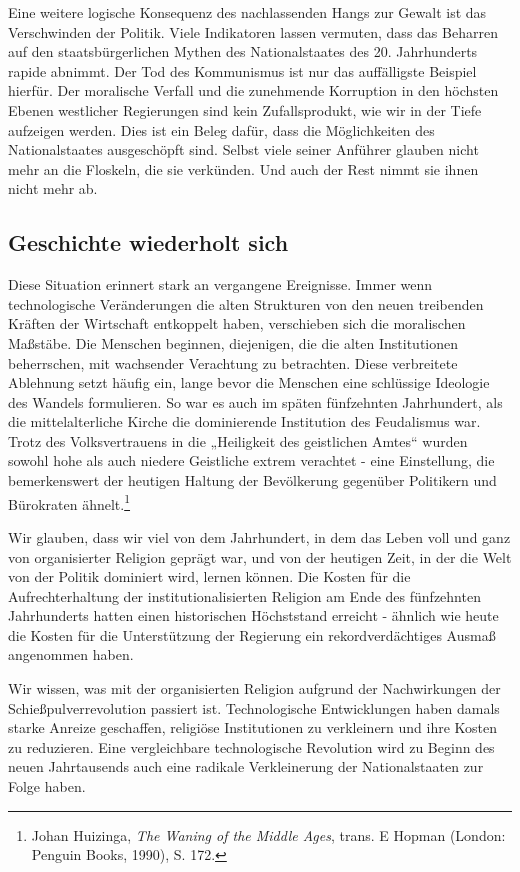 \documentclass[
  a5paper,
  smalldemyvopaper,10pt,twoside,onecolumn,openright,extrafontsizes,hidelinks]{memoir}
\begin{document}
Eine weitere logische Konsequenz des nachlassenden Hangs zur Gewalt ist
das Verschwinden der Politik. Viele Indikatoren lassen vermuten, dass
das Beharren auf den staatsbürgerlichen Mythen des Nationalstaates des
20. Jahrhunderts rapide abnimmt. Der Tod des Kommunismus ist nur das
auffälligste Beispiel hierfür. Der moralische Verfall und die zunehmende
Korruption in den höchsten Ebenen westlicher Regierungen sind kein
Zufallsprodukt, wie wir in der Tiefe aufzeigen werden. Dies ist ein
Beleg dafür, dass die Möglichkeiten des Nationalstaates ausgeschöpft
sind. Selbst viele seiner Anführer glauben nicht mehr an die Floskeln,
die sie verkünden. Und auch der Rest nimmt sie ihnen nicht mehr ab.

\subsection{Geschichte wiederholt
sich}\label{geschichte-wiederholt-sich}

Diese Situation erinnert stark an vergangene Ereignisse. Immer wenn
technologische Veränderungen die alten Strukturen von den neuen
treibenden Kräften der Wirtschaft entkoppelt haben, verschieben sich die
moralischen Maßstäbe. Die Menschen beginnen, diejenigen, die die alten
Institutionen beherrschen, mit wachsender Verachtung zu betrachten.
Diese verbreitete Ablehnung setzt häufig ein, lange bevor die Menschen
eine schlüssige Ideologie des Wandels formulieren. So war es auch im
späten fünfzehnten Jahrhundert, als die mittelalterliche Kirche die
dominierende Institution des Feudalismus war. Trotz des Volksvertrauens
in die „Heiligkeit des geistlichen Amtes`` wurden sowohl hohe als auch
niedere Geistliche extrem verachtet - eine Einstellung, die
bemerkenswert der heutigen Haltung der Bevölkerung gegenüber Politikern
und Bürokraten ähnelt.\footnote{Johan Huizinga, \emph{The Waning of the
  Middle Ages}, trans. E Hopman (London: Penguin Books, 1990), S. 172.}

Wir glauben, dass wir viel von dem Jahrhundert, in dem das Leben voll
und ganz von organisierter Religion geprägt war, und von der heutigen
Zeit, in der die Welt von der Politik dominiert wird, lernen können. Die
Kosten für die Aufrechterhaltung der institutionalisierten Religion am
Ende des fünfzehnten Jahrhunderts hatten einen historischen Höchststand
erreicht - ähnlich wie heute die Kosten für die Unterstützung der
Regierung ein rekordverdächtiges Ausmaß angenommen haben.

Wir wissen, was mit der organisierten Religion aufgrund der
Nachwirkungen der Schießpulverrevolution passiert ist. Technologische
Entwicklungen haben damals starke Anreize geschaffen, religiöse
Institutionen zu verkleinern und ihre Kosten zu reduzieren. Eine
vergleichbare technologische Revolution wird zu Beginn des neuen
Jahrtausends auch eine radikale Verkleinerung der Nationalstaaten zur
Folge haben.
\end{document}
